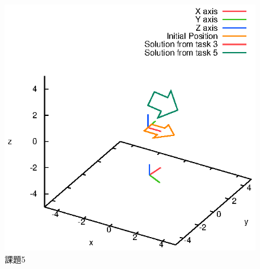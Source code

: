 \documentclass[a4paper,10pt]{jsarticle}
\begin{document}
\begin{figure}[b]
  \begin{center}
    \includegraphics[clip,width=14cm]{fig/eps/5.eps}
  \end{center}
  \caption{課題5}
  \label{fig:課題5}
\end{figure}
\end{document}
